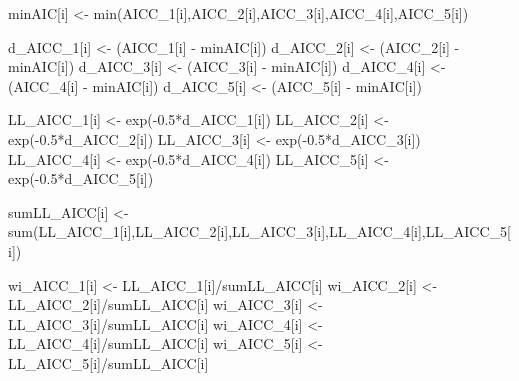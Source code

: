 \documentclass[
  letterpaper,
]{book}
\newenvironment{Shaded}{\begin{snugshade}}{\end{snugshade}}
\newcommand{\FloatTok}[1]{\textcolor[rgb]{0.68,0.00,0.00}{#1}}
\newcommand{\FunctionTok}[1]{\textcolor[rgb]{0.28,0.35,0.67}{#1}}
\newcommand{\NormalTok}[1]{\textcolor[rgb]{0.00,0.23,0.31}{#1}}
\newcommand{\OtherTok}[1]{\textcolor[rgb]{0.00,0.23,0.31}{#1}}
\newcommand{\SpecialCharTok}[1]{\textcolor[rgb]{0.37,0.37,0.37}{#1}}
\begin{document}
\begin{Shaded}
\begin{Highlighting}[]
\NormalTok{minAIC[i] }\OtherTok{\textless{}{-}} \FunctionTok{min}\NormalTok{(AICC\_1[i],AICC\_2[i],AICC\_3[i],AICC\_4[i],AICC\_5[i])}

\NormalTok{d\_AICC\_1[i] }\OtherTok{\textless{}{-}}\NormalTok{ (AICC\_1[i] }\SpecialCharTok{{-}}\NormalTok{ minAIC[i])}
\NormalTok{d\_AICC\_2[i] }\OtherTok{\textless{}{-}}\NormalTok{ (AICC\_2[i] }\SpecialCharTok{{-}}\NormalTok{ minAIC[i])}
\NormalTok{d\_AICC\_3[i] }\OtherTok{\textless{}{-}}\NormalTok{ (AICC\_3[i] }\SpecialCharTok{{-}}\NormalTok{ minAIC[i])}
\NormalTok{d\_AICC\_4[i] }\OtherTok{\textless{}{-}}\NormalTok{ (AICC\_4[i] }\SpecialCharTok{{-}}\NormalTok{ minAIC[i])}
\NormalTok{d\_AICC\_5[i] }\OtherTok{\textless{}{-}}\NormalTok{ (AICC\_5[i] }\SpecialCharTok{{-}}\NormalTok{ minAIC[i])}

\NormalTok{LL\_AICC\_1[i] }\OtherTok{\textless{}{-}} \FunctionTok{exp}\NormalTok{(}\SpecialCharTok{{-}}\FloatTok{0.5}\SpecialCharTok{*}\NormalTok{d\_AICC\_1[i])}
\NormalTok{LL\_AICC\_2[i] }\OtherTok{\textless{}{-}} \FunctionTok{exp}\NormalTok{(}\SpecialCharTok{{-}}\FloatTok{0.5}\SpecialCharTok{*}\NormalTok{d\_AICC\_2[i])}
\NormalTok{LL\_AICC\_3[i] }\OtherTok{\textless{}{-}} \FunctionTok{exp}\NormalTok{(}\SpecialCharTok{{-}}\FloatTok{0.5}\SpecialCharTok{*}\NormalTok{d\_AICC\_3[i])}
\NormalTok{LL\_AICC\_4[i] }\OtherTok{\textless{}{-}} \FunctionTok{exp}\NormalTok{(}\SpecialCharTok{{-}}\FloatTok{0.5}\SpecialCharTok{*}\NormalTok{d\_AICC\_4[i])}
\NormalTok{LL\_AICC\_5[i] }\OtherTok{\textless{}{-}} \FunctionTok{exp}\NormalTok{(}\SpecialCharTok{{-}}\FloatTok{0.5}\SpecialCharTok{*}\NormalTok{d\_AICC\_5[i])}

\NormalTok{sumLL\_AICC[i] }\OtherTok{\textless{}{-}} \FunctionTok{sum}\NormalTok{(LL\_AICC\_1[i],LL\_AICC\_2[i],LL\_AICC\_3[i],LL\_AICC\_4[i],LL\_AICC\_5[i])}

\NormalTok{wi\_AICC\_1[i] }\OtherTok{\textless{}{-}}\NormalTok{ LL\_AICC\_1[i]}\SpecialCharTok{/}\NormalTok{sumLL\_AICC[i]}
\NormalTok{wi\_AICC\_2[i] }\OtherTok{\textless{}{-}}\NormalTok{ LL\_AICC\_2[i]}\SpecialCharTok{/}\NormalTok{sumLL\_AICC[i]}
\NormalTok{wi\_AICC\_3[i] }\OtherTok{\textless{}{-}}\NormalTok{ LL\_AICC\_3[i]}\SpecialCharTok{/}\NormalTok{sumLL\_AICC[i]}
\NormalTok{wi\_AICC\_4[i] }\OtherTok{\textless{}{-}}\NormalTok{ LL\_AICC\_4[i]}\SpecialCharTok{/}\NormalTok{sumLL\_AICC[i]}
\NormalTok{wi\_AICC\_5[i] }\OtherTok{\textless{}{-}}\NormalTok{ LL\_AICC\_5[i]}\SpecialCharTok{/}\NormalTok{sumLL\_AICC[i]}


\end{Highlighting}
\end{Shaded}
\end{document}
